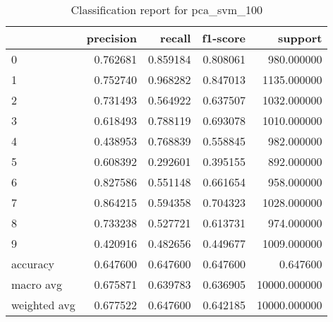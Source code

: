 \begin{table}[htb!]
\centering
\caption{Classification report for pca_svm_100}
\label{tab:classification-report-pca_svm_100}
\begin{tabular}{lrrrr}
\toprule
 & precision & recall & f1-score & support \\
\midrule
0 & 0.762681 & 0.859184 & 0.808061 & 980.000000 \\
1 & 0.752740 & 0.968282 & 0.847013 & 1135.000000 \\
2 & 0.731493 & 0.564922 & 0.637507 & 1032.000000 \\
3 & 0.618493 & 0.788119 & 0.693078 & 1010.000000 \\
4 & 0.438953 & 0.768839 & 0.558845 & 982.000000 \\
5 & 0.608392 & 0.292601 & 0.395155 & 892.000000 \\
6 & 0.827586 & 0.551148 & 0.661654 & 958.000000 \\
7 & 0.864215 & 0.594358 & 0.704323 & 1028.000000 \\
8 & 0.733238 & 0.527721 & 0.613731 & 974.000000 \\
9 & 0.420916 & 0.482656 & 0.449677 & 1009.000000 \\
accuracy & 0.647600 & 0.647600 & 0.647600 & 0.647600 \\
macro avg & 0.675871 & 0.639783 & 0.636905 & 10000.000000 \\
weighted avg & 0.677522 & 0.647600 & 0.642185 & 10000.000000 \\
\bottomrule
\end{tabular}
\end{table}
